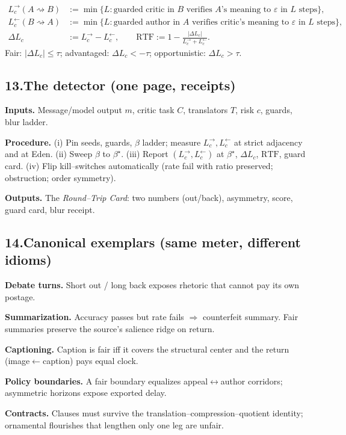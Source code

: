 \documentclass[11pt]{article}
\begin{document}
\begin{align*}
L^{\rightarrow}_c(A\rightsquigarrow B)&:=\min\{L:\text{guarded critic in $B$ verifies $A$'s meaning to $\varepsilon$ in $L$ steps}\},\\
L^{\leftarrow}_c(B\rightsquigarrow A)&:=\min\{L:\text{guarded author in $A$ verifies critic's meaning to $\varepsilon$ in $L$ steps}\},\\
\Delta L_c&:=L^{\rightarrow}_c-L^{\leftarrow}_c,\qquad
\mathrm{RTF}:=1-\frac{|\Delta L_c|}{L^{\rightarrow}_c+L^{\leftarrow}_c}.
\end{align*}
Fair: $|\Delta L_c|\le\tau$; advantaged: $\Delta L_c<-\tau$; opportunistic: $\Delta L_c>\tau$.

\subsection*{13.\quad The detector (one page, receipts)}
\textbf{Inputs.} Message/model output $m$, critic task $C$, translators $T$, risk $c$, guards, blur ladder.

\textbf{Procedure.} (i) Pin seeds, guards, $\beta$ ladder; measure $L^{\rightarrow}_c,L^{\leftarrow}_c$ at strict adjacency and at Eden. (ii) Sweep $\beta$ to $\beta^\star$. (iii) Report $(L^{\rightarrow}_c,L^{\leftarrow}_c)$ at $\beta^\star$, $\Delta L_c$, $\mathrm{RTF}$, guard card. (iv) Flip kill--switches automatically (rate fail with ratio preserved; obstruction; order symmetry).

\textbf{Outputs.} The \emph{Round--Trip Card}: two numbers (out/back), asymmetry, score, guard card, blur receipt.

\subsection*{14.\quad Canonical exemplars (same meter, different idioms)}
\textbf{Debate turns.} Short out / long back exposes rhetoric that cannot pay its own postage.

\textbf{Summarization.} Accuracy passes but rate fails $\Rightarrow$ counterfeit summary. Fair summaries preserve the source's salience ridge on return.

\textbf{Captioning.} Caption is fair iff it covers the structural center and the return (image$\leftarrow$caption) pays equal clock.

\textbf{Policy boundaries.} A fair boundary equalizes appeal$\leftrightarrow$author corridors; asymmetric horizons expose exported delay.

\textbf{Contracts.} Clauses must survive the translation--compression--quotient identity; ornamental flourishes that lengthen only one leg are unfair.
\end{document}
